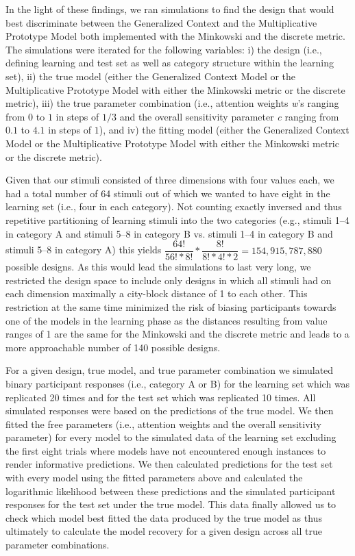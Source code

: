 \documentclass[a4paper,man,natbib]{apa6}
\begin{document}
In the light of these findings, we ran simulations to find the design that would best discriminate between the Generalized Context and the Multiplicative Prototype Model both implemented with the Minkowski and the discrete metric. The simulations were iterated for the following variables: i) the design (i.e., defining learning and test set as well as category structure within the learning set), ii) the true model (either the Generalized Context Model or the Multiplicative Prototype Model with either the Minkowski metric or the discrete metric), iii) the true parameter combination (i.e., attention weights \textit{w}'s ranging from $0$ to $1$ in steps of $1/3$ and the overall sensitivity parameter \textit{c} ranging from $0.1$ to $4.1$ in steps of $1$), and iv) the fitting model (either the Generalized Context Model or the Multiplicative Prototype Model with either the Minkowski metric or the discrete metric).

Given that our stimuli consisted of three dimensions with four values each, we had a total number of 64 stimuli out of which we wanted to have eight in the learning set (i.e., four in each category). Not counting exactly inversed and thus repetitive partitioning of learning stimuli into the two categories (e.g., stimuli 1--4 in category A and stimuli 5--8 in category B vs. stimuli 1--4 in category B and stimuli 5--8 in category A) this yields $\dfrac{64!}{56!*8!}*\dfrac{8!}{8!*4!*2} = 154,915,787,880$ possible designs. As this would lead the simulations to last very long, we restricted the design space to include only designs in which all stimuli had on each dimension maximally a city-block distance of 1 to each other. This restriction at the same time minimized the risk of biasing participants towards one of the models in the learning phase as the distances resulting from value ranges of 1 are the same for the Minkowski and the discrete metric and leads to a more approachable number of 140 possible designs.

For a given design, true model, and true parameter combination we simulated binary participant responses (i.e., category A or B) for the learning set which was replicated 20 times and for the test set which was replicated 10 times. All simulated responses were based on the predictions of the true model. We then fitted the free parameters (i.e., attention weights and the overall sensitivity parameter) for every model to the simulated data of the learning set excluding the first eight trials where models have not encountered enough instances to render informative predictions. We then calculated predictions for the test set with every model using the fitted parameters above and calculated the logarithmic likelihood between these predictions and the simulated participant responses for the test set under the true model. This data finally allowed us to check which model best fitted the data produced by the true model as thus ultimately to calculate the model recovery for a given design across all true parameter combinations.
\end{document}
